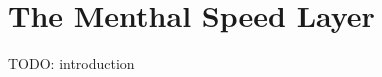 \chapter{The Menthal Speed Layer}
\label{chap:menthal_backend_architecture}

TODO: introduction








